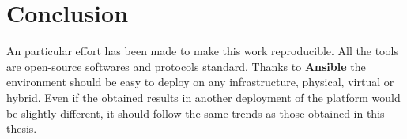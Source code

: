 \section*{Conclusion}

An particular effort has been made to make this work reproducible.
All the tools are open-source softwares and protocols standard.
Thanks to \textbf{Ansible} the environment should be easy
to deploy on any infrastructure, physical, virtual or hybrid. 
Even if the obtained results in another deployment of the platform
would be slightly different, it should follow the same trends as
those obtained in this thesis.


